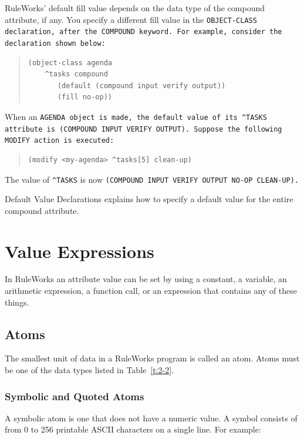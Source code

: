 RuleWorks' default fill value depends on the data type of the compound
attribute, if any. You specify a different fill value in the
\tt{OBJECT-CLASS} declaration, after the \tt{COMPOUND} keyword. For
example, consider the declaration shown below:

\begin{quote}
\begin{verbatim}
(object-class agenda
    ^tasks compound
       (default (compound input verify output))
       (fill no-op))
\end{verbatim}
\end{quote}

When an \tt{AGENDA} object is made, the default value of its
\verb|^TASKS| attribute is \tt{(COMPOUND INPUT VERIFY
  OUTPUT)}. Suppose the following \tt{MODIFY} action is executed:

\begin{quote}
\begin{verbatim}
(modify <my-agenda> ^tasks[5] clean-up)
\end{verbatim}
\end{quote}

The value of \verb|^TASKS| is now \tt{(COMPOUND INPUT VERIFY OUTPUT
  NO-OP CLEAN-UP)}.

Default Value Declarations explains how to specify a default value for
the entire compound attribute.

\section{Value Expressions}

In RuleWorks an attribute value can be set by using a constant, a
variable, an arithmetic expression, a function call, or an expression
that contains any of these things.

\subsection{Atoms}

The smallest unit of data in a RuleWorks program is called an
atom. Atoms must be one of the data types listed in Table~\ref{t:2-2}.

\subsubsection{Symbolic and Quoted Atoms}

A symbolic atom is one that does not have a numeric value. A symbol
consists of from 0 to 256 printable ASCII characters on a single
line. For example:

